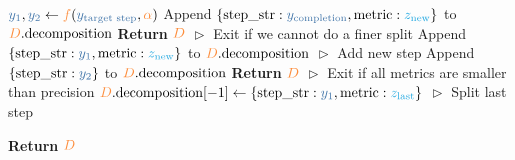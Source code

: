 \begin{algorithm}[h!]
\begin{algorithmic}[1]
        \STATE $\textcolor{algcolor3}{y_1}, \textcolor{algcolor3}{y_2} \gets \textcolor{algcolor6}{f}(\textcolor{algcolor3}{y_{\text{target step}}}, \textcolor{algcolor6}{\alpha})$
            \STATE Append $\{\text{step\_str}: \textcolor{algcolor3}{y_{\text{completion}}}, \text{metric}: \textcolor{algcolor5}{z_{\text{new}}} \}$ to $\textcolor{algcolor6}{D}.\text{decomposition}$
            \STATE \textbf{Return} $\textcolor{algcolor6}{D}$ \hspace*{\fill} \textcolor{algcolor2}{$\vartriangleright$ Exit if we cannot do a finer split}
        \ENDIF
            \STATE Append $\{\text{step\_str}: \textcolor{algcolor3}{y_1}, \text{metric}: \textcolor{algcolor5}{z_{\text{new}}} \}$ to $\textcolor{algcolor6}{D}.\text{decomposition}$
            \hspace*{\fill} \textcolor{algcolor2}{$\vartriangleright$ Add new step}
                \STATE Append $\{\text{step\_str}: \textcolor{algcolor3}{y_2} \}$ to $\textcolor{algcolor6}{D}.\text{decomposition}$
                \STATE \textbf{Return} $\textcolor{algcolor6}{D}$ \hspace*{\fill} \textcolor{algcolor2}{$\vartriangleright$ Exit if all metrics are smaller than precision}
            \ENDIF
        \ELSE 
            \STATE $\textcolor{algcolor6}{D}.\text{decomposition}[-1] \gets \{\text{step\_str}: \textcolor{algcolor3}{y_1}, \text{metric}: \textcolor{algcolor5}{z_{\text{last}}} \}$
            \hspace*{\fill} \textcolor{algcolor2}{$\vartriangleright$ Split last step}
        \ENDIF
    \ENDWHILE

    \STATE \textbf{Return} $\textcolor{algcolor6}{D}$
\end{algorithmic}
\end{algorithm}


\newpage